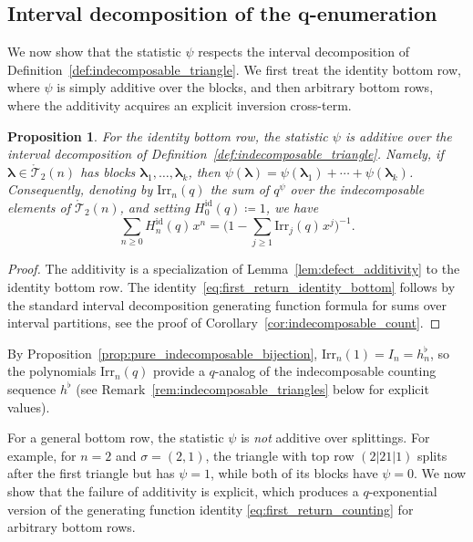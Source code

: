 \documentclass[pdftex]{sigma}
\numberwithin{equation}{section}
\newcommand{\ssp}{\hspace{1pt}}
\newtheorem{Proposition}[Theorem]{Proposition}
\theoremstyle{definition}
\begin{document}
\subsection[Interval decomposition of the q-enumeration]{Interval decomposition of the $\boldsymbol{q}$-enumeration}
\label{subsec:q_interval_decomposition}

We now show that the statistic $\psi$ respects the interval decomposition of
Definition~\ref{def:indecomposable_triangle}.
We first treat the identity bottom row, where $\psi$ is simply additive
over the blocks, and then arbitrary bottom rows, where the additivity
acquires an explicit inversion cross-term.

\begin{Proposition}
	\label{prop:psi_multiplicative}
	For the identity bottom row,
	the statistic $\psi$ is additive over the interval decomposition of
	Definition~{\rm \ref{def:indecomposable_triangle}}.
	Namely, if
	$\boldsymbol\lambda\in\mathring{\mathcal{T}}_2(n)$ has blocks
	$\boldsymbol\lambda_1,\dots,\boldsymbol\lambda_k$, then
	$\psi(\boldsymbol\lambda)
	=\psi(\boldsymbol\lambda_1)+\cdots+\psi(\boldsymbol\lambda_k)$.
	Consequently, denoting by $\mathrm{Irr}_n(q)$ the sum of $q^{\psi}$
	over the indecomposable elements of $\mathring{\mathcal{T}}_2(n)$, and
	setting $H_0^{\mathrm{id}}(q)\coloneqq1$, we have
	\begin{equation}
		\label{eq:first_return_identity_bottom}
		\sum_{n\ge0} H_n^{\mathrm{id}}(q)\ssp x^n =
		\biggl(1-\sum_{j\ge1} \mathrm{Irr}_j(q)\ssp x^j\biggr)^{-1}.
	\end{equation}
\end{Proposition}
\begin{proof}
The additivity is a specialization of Lemma~\ref{lem:defect_additivity} to the identity bottom row. The identity~\eqref{eq:first_return_identity_bottom} follows by the standard interval decomposition generating function formula for sums over interval partitions, see the proof of Corollary~\ref{cor:indecomposable_count}.
\end{proof}

By Proposition~\ref{prop:pure_indecomposable_bijection},
$\mathrm{Irr}_n(1)=I_n=h^\flat_n$, so the polynomials $\mathrm{Irr}_n(q)$
provide a $q$-analog of the indecomposable counting
sequence $h^\flat$ (see
Remark~\ref{rem:indecomposable_triangles} below for explicit values).

For a general bottom row, the statistic $\psi$ is \emph{not} additive
over splittings. For example, for $n=2$ and $\sigma=(2,1)$, the triangle with top row
$(2|21|1)$ splits after the first triangle but has $\psi=1$, while both
of its blocks have $\psi=0$.
We now show that the failure of additivity is explicit,
which produces a
$q$-exponential version of
the generating function identity \eqref{eq:first_return_counting} for arbitrary bottom rows.
\end{document}
